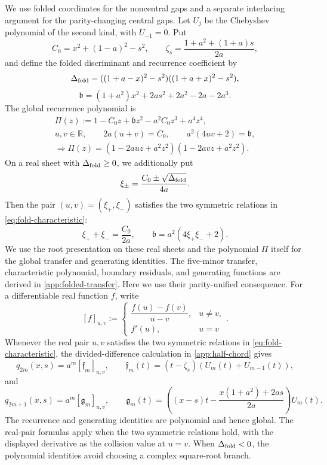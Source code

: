 \documentclass[10pt,twoside]{siamart1116}
\numberwithin{equation}{section}
\begin{document}
We use folded coordinates for the noncentral gaps and a separate
interlacing argument for the parity-changing central gaps.
Let \(U_j\) be the Chebyshev polynomial of the second kind, with
\(U_{-1}=0\).  Put
\[
 C_0=x^2+(1-a)^2-s^2,\qquad
 \zeta_s=\frac{1+a^2+(1+a)s}{2a},
\]
and define the folded discriminant and recurrence coefficient by
\[
 \Delta_{\rm fold}=((1+a-x)^2-s^2)((1+a+x)^2-s^2),
\]
\[
 \mathfrak b=(1+a^2)x^2+2as^2+2a^2-2a-2a^3.
\]
The global recurrence polynomial is
\begin{equation}\label{eq:fold-characteristic}
\begin{gathered}
 \Pi(z):=1-C_0z+\mathfrak b z^2-a^2C_0z^3+a^4z^4,\\
 u,v\in\mathbb R,\qquad
 2a(u+v)=C_0,\qquad a^2(4uv+2)=\mathfrak b,\\
 \Longrightarrow
 \Pi(z)=(1-2auz+a^2z^2)(1-2avz+a^2z^2).
\end{gathered}
\end{equation}
On a real sheet with \(\Delta_{\rm fold}\geq0\), we additionally put
\[
 \xi_\pm=\frac{C_0\pm\sqrt{\Delta_{\rm fold}}}{4a}.
\]
Then the pair \((u,v)=(\xi_+,\xi_-)\) satisfies the two symmetric
relations in \eqref{eq:fold-characteristic}:
\[
 \xi_++\xi_-=\frac{C_0}{2a},\qquad
 \mathfrak b=a^2(4\xi_+\xi_-+2).
\]
We use the root presentation on these real sheets and the polynomial
\(\Pi\) itself for the global transfer and generating identities.
The five-minor transfer, characteristic polynomial, boundary residuals, and
generating functions are derived in \cref{app:folded-transfer}.  Here we use
their parity-unified consequence.  For a differentiable real function \(f\),
write
\[
 [f]_{u,v}:=
 \begin{cases}
  \dfrac{f(u)-f(v)}{u-v},&u\neq v,\\[2mm]
  f'(u),&u=v
 \end{cases}.
\]
Whenever the real pair \(u,v\) satisfies the two symmetric relations in
\eqref{eq:fold-characteristic}, the divided-difference calculation in
\cref{app:half-chord} gives
\begin{equation}\label{eq:fold-even}
 q_{2m}(x,s)=a^m[\mathfrak f_m]_{u,v},\qquad
 \mathfrak f_m(t)=(t-\zeta_s)(U_m(t)+U_{m-1}(t)),
\end{equation}
and
\begin{equation}\label{eq:fold-odd}
 q_{2m+1}(x,s)=a^m[\mathfrak g_m]_{u,v},\qquad
 \mathfrak g_m(t)=\left((x-s)t-
 \frac{x(1+a^2)+2as}{2a}\right)U_m(t).
\end{equation}
The recurrence and generating identities are polynomial and hence global.
The real-pair formulas apply when the two symmetric relations hold, with the
displayed derivative as the collision value at \(u=v\).  When
\(\Delta_{\rm fold}<0\), the polynomial identities avoid choosing a complex
square-root branch.
\end{document}
